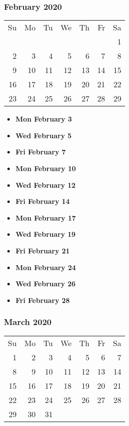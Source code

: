 \documentclass[11pt]{article}
\begin{document}
\subsubsection*{February 2020}
\begin{tabular}{rrrrrrr}
Su & Mo & Tu & We & Th & Fr & Sa\\
   &    &    &    &    &    &  1\\ 
 2 &  3 &  4 &  5 &  6 &  7 &  8\\ 
 9 & 10 & 11 & 12 & 13 & 14 & 15\\ 
16 & 17 & 18 & 19 & 20 & 21 & 22\\ 
23 & 24 & 25 & 26 & 27 & 28 & 29\\ 
\end{tabular}
\begin{itemize}
\item\textbf{Mon February  3}
\item\textbf{Wed February  5}
\item\textbf{Fri February  7}
\item\textbf{Mon February 10}
\item\textbf{Wed February 12}
\item\textbf{Fri February 14}
\item\textbf{Mon February 17}
\item\textbf{Wed February 19}
\item\textbf{Fri February 21}
\item\textbf{Mon February 24}
\item\textbf{Wed February 26}
\item\textbf{Fri February 28}
\end{itemize}
\hrulefill

\subsubsection*{March 2020}
\begin{tabular}{rrrrrrr}
Su & Mo & Tu & We & Th & Fr & Sa\\
 1 &  2 &  3 &  4 &  5 &  6 &  7\\ 
 8 &  9 & 10 & 11 & 12 & 13 & 14\\ 
15 & 16 & 17 & 18 & 19 & 20 & 21\\ 
22 & 23 & 24 & 25 & 26 & 27 & 28\\
29 & 30 & 31 &    &    &    & \\
\end{tabular}
\end{document}
